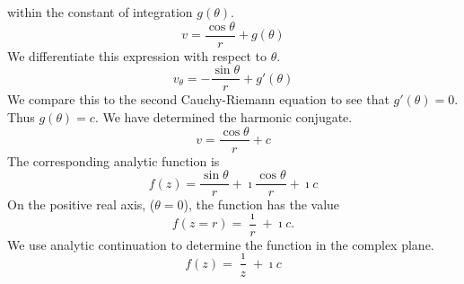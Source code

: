 {\begin{Solution}
\begin{enumerate}
    within the constant of integration $g(\theta)$.
    \[
    v = \frac{\cos \theta}{r} + g(\theta)
    \]
    We differentiate this expression with respect to $\theta$.
    \[
    v_\theta = - \frac{\sin \theta}{r} + g'(\theta)
    \]
    We compare this to the second Cauchy-Riemann equation to see that
    $g'(\theta) = 0$.  Thus $g(\theta) = c$.  We have determined the harmonic conjugate.
    \[
    \boxed{
      v = \frac{\cos \theta}{r} + c
      }
    \]
    The corresponding analytic function is 
    \[
    f(z) = \frac{\sin \theta}{r} + \imath  \frac{\cos \theta}{r} + \imath c
    \]
    On the positive real axis, ($\theta = 0$), the function has the value
    \[
    f(z = r) = \frac{\imath}{r} + \imath c.
    \]
    We use analytic continuation to determine the function in the 
    complex plane.
    \[
    \boxed{
      f(z) = \frac{\imath}{z} + \imath c
      }
    \]
  \end{enumerate}
\end{Solution}








}
